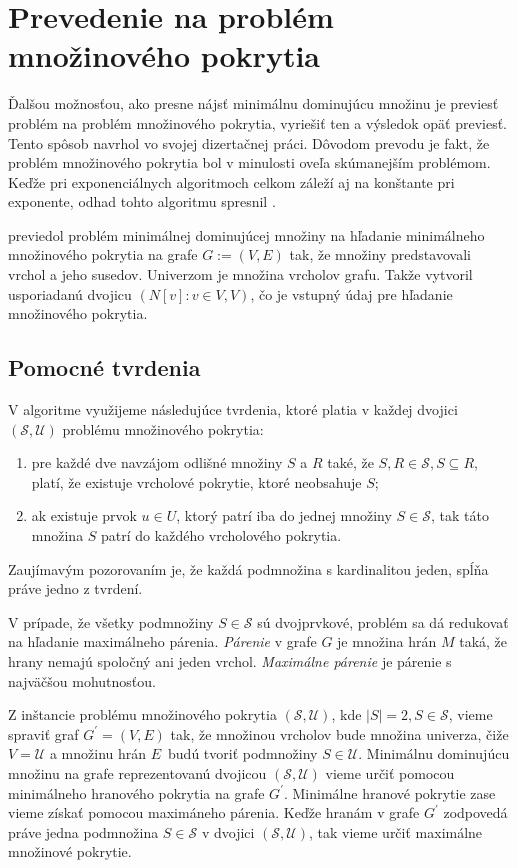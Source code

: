 \section{Prevedenie na problém množinového pokrytia}

Ďalšou možnosťou, ako presne nájsť minimálnu dominujúcu množinu je previesť 
problém na problém množinového pokrytia, vyriešiť ten a výsledok opäť previesť.
Tento spôsob navrhol \citet{grandoni04} vo svojej dizertačnej práci. Dôvodom 
prevodu je fakt, že problém množinového pokrytia bol v minulosti oveľa 
skúmanejším problémom.
Keďže pri exponenciálnych algoritmoch celkom záleží aj na konštante pri 
exponente, odhad tohto algoritmu spresnil \citet{fomin05}. 

\citet{grandoni04} previedol problém minimálnej dominujúcej množiny na 
hľadanie minimálneho množinového pokrytia na grafe $G := (V, E)$ tak, že 
množiny predstavovali vrchol a jeho susedov. Univerzom je množina vrcholov 
grafu. Takže vytvoril usporiadanú dvojicu $({N[v] : v \in V }, V)$, čo je 
vstupný údaj pre hľadanie množinového pokrytia.

\subsection{Pomocné tvrdenia}

V algoritme využijeme následujúce tvrdenia, ktoré platia v každej dvojici 
$(\mathcal{S}, \mathcal{U})$ problému množinového pokrytia:
\begin{enumerate}
	\item pre každé dve navzájom odlišné množiny $S$ a $R$ také, že 
		$S, R \in \mathcal{S}, S \subseteq R$, platí, že existuje vrcholové 
		pokrytie, ktoré neobsahuje $S$;
	\item ak existuje prvok $u \in U$, ktorý patrí iba do jednej množiny 
		$S \in \mathcal{S}$, tak táto množina $S$ patrí do každého vrcholového 
		pokrytia.
\end{enumerate}

Zaujímavým pozorovaním je, že každá podmnožina s kardinalitou jeden, spĺňa 
práve jedno z tvrdení.

V prípade, že všetky podmnožiny $S \in \mathcal{S}$ sú dvojprvkové, problém 
sa dá redukovať na hľadanie maximálneho párenia. \emph{Párenie} v grafe $G$ 
je množina hrán $M$ taká, že hrany nemajú spoločný ani jeden vrchol. 
\emph{Maximálne párenie} je párenie s najväčšou mohutnosťou.

Z inštancie problému množinového pokrytia $(\mathcal{S}, \mathcal{U})$, kde 
$|S| = 2, S \in \mathcal{S}$, vieme spraviť graf $G^\prime = (V, E)$ tak, 
že množinou vrcholov bude množina univerza, čiže $V = \mathcal{U}$ a množinu 
hrán $E$ budú tvoriť podmnožiny $S \in \mathcal{U}$. Minimálnu dominujúcu 
množinu na grafe reprezentovanú dvojicou $(\mathcal{S}, \mathcal{U})$ vieme 
určiť pomocou minimálneho hranového pokrytia na grafe $G^\prime$. 
Minimálne hranové pokrytie zase vieme získať pomocou maximáneho párenia. 
Keďže hranám v grafe $G^\prime$ zodpovedá práve jedna podmnožina 
$S \in \mathcal{S}$ v dvojici $(\mathcal{S}, \mathcal{U})$, tak vieme určiť 
maximálne množinové pokrytie.

